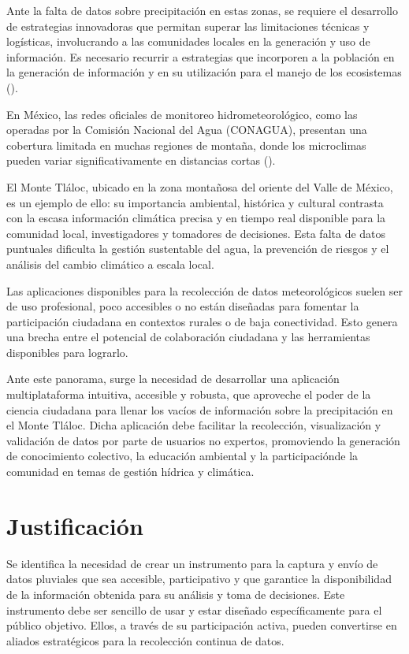 Ante la falta de datos sobre precipitación en estas zonas, se requiere el desarrollo de estrategias innovadoras que permitan superar las limitaciones técnicas y logísticas, involucrando a las comunidades locales en la generación y uso de información. Es necesario recurrir a estrategias que incorporen a la población en la generación de información y en su utilización para el manejo de los ecosistemas (\cite{hubp1990}).


En México, las redes oficiales de monitoreo hidrometeorológico, como las operadas por la Comisión Nacional del Agua (CONAGUA), presentan una cobertura limitada en muchas regiones de montaña, donde los microclimas pueden variar significativamente en distancias cortas (\cite{rosas2021}).


El Monte Tláloc, ubicado en la zona montañosa del oriente del Valle de México, es un ejemplo de ello: su importancia ambiental, histórica y cultural contrasta con la escasa información climática precisa y en tiempo real disponible para la comunidad local, investigadores y tomadores de decisiones. Esta falta de datos puntuales dificulta la gestión sustentable del agua, la prevención de riesgos y el análisis del cambio climático a escala local.

Las aplicaciones disponibles para la recolección de datos meteorológicos suelen ser de uso profesional, poco accesibles o no están diseñadas para fomentar la participación ciudadana en contextos rurales o de baja conectividad. Esto genera una brecha entre el potencial de colaboración ciudadana y las herramientas disponibles para lograrlo.

Ante este panorama, surge la necesidad de desarrollar una aplicación multiplataforma intuitiva, accesible y robusta, que aproveche el poder de la ciencia ciudadana para llenar los vacíos de información sobre la precipitación en el Monte Tláloc. Dicha aplicación debe facilitar la recolección, visualización y validación de datos por parte de usuarios no expertos, promoviendo la generación de conocimiento colectivo, la educación ambiental y la participaciónde la comunidad en temas de gestión hídrica y climática.



\section{Justificación}
Se identifica la necesidad de crear un instrumento para la captura y envío de datos pluviales que sea accesible, participativo y que garantice la disponibilidad de la información obtenida para su análisis y toma de decisiones. Este instrumento debe ser sencillo de usar y estar diseñado específicamente para el público objetivo. Ellos, a través de su participación activa, pueden convertirse en aliados estratégicos para la recolección continua de datos.

